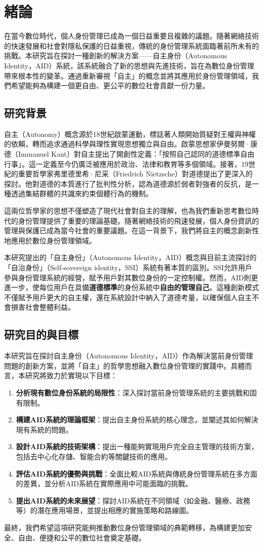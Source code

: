 
\chapter{緒論}
在當今數位時代，個人身份管理已成為一個日益重要且複雜的議題。隨著網絡技術的快速發展和社會對隱私保護的日益重視，傳統的身份管理系統面臨著前所未有的挑戰。本研究旨在探討一種創新的解決方案——自主身份（Autonomous Identity，AID）系統，該系統融合了新的思想與先進技術，旨在為數位身份管理帶來根本性的變革。通過重新審視「自主」的概念並將其應用於身份管理領域，我們希望能夠為構建一個更自由、更公平的數位社會貢獻一份力量。
\section{研究背景}
自主（Autonomy）概念源於18世紀啟蒙運動，標誌著人類開始質疑對王權與神權的依賴，轉而追求通過科學與理性實現思想獨立與自由。啟蒙思想家伊曼努爾·康德（Immanuel Kant）對自主提出了開創性定義：「按照自己認同的道德標準自由行事」。這一定義至今仍廣泛被應用於政治、法律和教育等多個領域。接著，19世紀的重要哲學家弗里德里希·尼采（Friedrich Nietzsche）對道德提出了更深入的探討。他對道德的本質進行了批判性分析，認為道德源於弱者對強者的反抗，是一種透過集結群體的共識來約束個體行為的機制。

這兩位哲學家的思想不僅塑造了現代社會對自主的理解，也為我們重新思考數位時代的身份管理提供了重要的理論基礎。隨著網絡技術的飛速發展，個人身份資訊的管理與保護已成為當今社會的重要議題。在這一背景下，我們將自主的概念創新性地應用於數位身份管理領域。

本研究提出的「自主身份」（Autonomous Identity，AID）概念與目前主流探討的「自治身份」（Self-sovereign identity，SSI）系統有著本質的區別。SSI允許用戶參與身份管理系統的經營，賦予用戶對其數位身份的一定控制權。然而，AID則更進一步，使每位用戶在具備\textbf{道德標準}的身份系統中\textbf{自由的管理自己}。這種創新模式不僅賦予用戶更大的自主權，還在系統設計中納入了道德考量，以確保個人自主不會損害社會整體利益。
\section{研究目的與目標}
本研究旨在探討自主身份（Autonomous Identity，AID）作為解決當前身份管理問題的創新方案，並將「自主」的哲學思想融入數位身份管理的實踐中。具體而言，本研究將致力於實現以下目標：
\begin{enumerate}
  \item \textbf{分析現有數位身份系統的局限性}：深入探討當前身份管理系統的主要挑戰和固有限制。
  \item \textbf{構建AID系統的理論框架}：提出自主身份系統的核心理念，並闡述其如何解決現有系統的問題。
  \item \textbf{設計AID系統的技術架構}：提出一種能夠實現用戶完全自主管理的技術方案，包括去中心化存儲、智能合約等關鍵技術的應用。
  \item \textbf{評估AID系統的優勢與挑戰}：全面比較AID系統與傳統身份管理系統在多方面的差異，並分析AID系統在實際應用中可能面臨的挑戰。
  \item \textbf{提出AID系統的未來展望}：探討AID系統在不同領域（如金融、醫療、政務等）的潛在應用場景，並提出相應的實施策略和路線圖。
\end{enumerate}
最終，我們希望這項研究能夠推動數位身份管理領域的典範轉移，為構建更加安全、自由、便捷和公平的數位社會奠定基礎。
